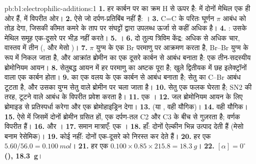 \begin{solution}{pb:b1:electrophilic-additions:1}
\textbf{1.} हर कार्बन पर  का क्रम H से ऊपर है:  में दोनों मेथिल
एक ही ओर हैं,  में विपरीत ओर।
\textbf{2.} ऐसे  जो दर्पण-प्रतिबिंब नहीं हैं: ।
\textbf{3.} C=C के परितः घूर्णन $\pi$ आबंध को तोड़ देगा, जिसकी कीमत
कमरे के ताप पर संघट्टों द्वारा उपलब्ध ऊर्जा से कहीं अधिक है।
\textbf{4.} : उसके मेथिल समूह एक-दूसरे पर भीड़ नहीं करते।
\textbf{5.} ।
\textbf{6.} दो तुल्य त्रिविम केंद्र: अधिक से अधिक चार, वास्तव में तीन
(,  और मेसो )।
\textbf{7.} $\pi$ युग्म  के एक Br परमाणु पर आक्रमण करता है, Br--Br युग्म
 के रूप में निकल जाता है, और आक्रांत ब्रोमीन का एक 
दूसरे कार्बन से आबंध बनाता है: एक तीन-सदस्यीय ब्रोमोनियम आयन।
\textbf{8.} सेतुबद्ध आयन में हर परमाणु का अष्टक पूरा है; खुले द्वितीयक
 में छह इलेक्ट्रॉनों वाला एक कार्बन होता।
\textbf{9.}  का एक  वलय के एक कार्बन से आबंध बनाता है; सेतु का C--Br आबंध
टूटता है, और उसका युग्म सेतु वाले ब्रोमीन पर चला जाता है।
\textbf{10.} सेतु एक फलक घेरता है; SN2 की तरह, 
टूटने वाले आबंध के विपरीत प्रवेश करता है।
\textbf{11.} एक ।
\textbf{12.} जल ब्रोमोनियम आयन के लिए ब्रोमाइड से प्रतिस्पर्धा करेगा और
एक ब्रोमोहाइड्रिन देगा।
\textbf{13.}  (या , वही यौगिक)।
\textbf{14.} वही यौगिक।
\textbf{15.} ऐसे  में जिसमें दोनों ब्रोमीन ग्रसित हों, एक दर्पण-तल
C2 और C3 के बीच से गुज़रता है; वर्णक विपरीत हैं।
\textbf{16.}  और ।
\textbf{17.} समान मात्राएँ: एक ।
\textbf{18.} हाँ: दोनों  ऐल्कीन भिन्न उत्पाद देती हैं
(मेसो बनाम रेसेमिक)।
\textbf{19.} कोई नहीं: दोनों  एक-दूसरे को निरस्त कर देते हैं।
\textbf{20.} हर एक $5.60/56.0 = \qty{0.100}{mol}$।
\textbf{21.} हर एक $0.100 \times 0.85 \times 215.8 = \qty{18.3}{g}$।
\textbf{22.} \textbf{$[\alpha] = 0^\circ$ (), \qty{18.3}{g}}।
\end{solution}
